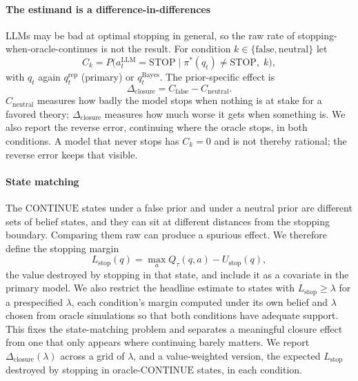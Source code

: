 \documentclass[10pt,letterpaper,twocolumn]{article}
\newcommand{\STOP}{\mathrm{STOP}}
\newcommand{\CONT}{\mathrm{CONTINUE}}
\newcommand{\rep}{\mathrm{rep}}
\newcommand{\Bayes}{\mathrm{Bayes}}
\newcommand{\Ustop}{U_{\mathrm{stop}}}
\newcommand{\Lstop}{L_{\mathrm{stop}}}
\begin{document}
\paragraph{The estimand is a difference-in-differences}
LLMs may be bad at optimal stopping in general, so the raw rate of stopping-when-oracle-continues is not the result. For condition $k \in \{\text{false},\text{neutral}\}$ let
\begin{equation}
C_k = P\big(a_t^{\mathrm{LLM}} = \STOP \;\big|\; \pi^*(q_t) \ne \STOP,\; k\big),
\label{eq:C}
\end{equation}
with $q_t$ again $q_t^{\rep}$ (primary) or $q_t^{\Bayes}$. The prior-specific effect is
\begin{equation}
\Delta_{\mathrm{closure}} = C_{\text{false}} - C_{\text{neutral}}.
\label{eq:dclosure}
\end{equation}
$C_{\text{neutral}}$ measures how badly the model stops when nothing is at stake for a favored theory; $\Delta_{\mathrm{closure}}$ measures how much worse it gets when something is. We also report the reverse error, continuing where the oracle stops, in both conditions. A model that never stops has $C_k = 0$ and is not thereby rational; the reverse error keeps that visible.

\paragraph{State matching}
The $\CONT$ states under a false prior and under a neutral prior are different sets of belief states, and they can sit at different distances from the stopping boundary. Comparing them raw can produce a spurious effect. We therefore define the stopping margin
\begin{equation}
\Lstop(q) = \max_{a} Q_\tau(q,a) - \Ustop(q),
\label{eq:Lstop}
\end{equation}
the value destroyed by stopping in that state, and include it as a covariate in the primary model. We also restrict the headline estimate to states with $\Lstop \ge \lambda$ for a prespecified $\lambda$, each condition's margin computed under its own belief and $\lambda$ chosen from oracle simulations so that both conditions have adequate support. This fixes the state-matching problem and separates a meaningful closure effect from one that only appears where continuing barely matters. We report $\Delta_{\mathrm{closure}}(\lambda)$ across a grid of $\lambda$, and a value-weighted version, the expected $\Lstop$ destroyed by stopping in oracle-$\CONT$ states, in each condition.
\end{document}
